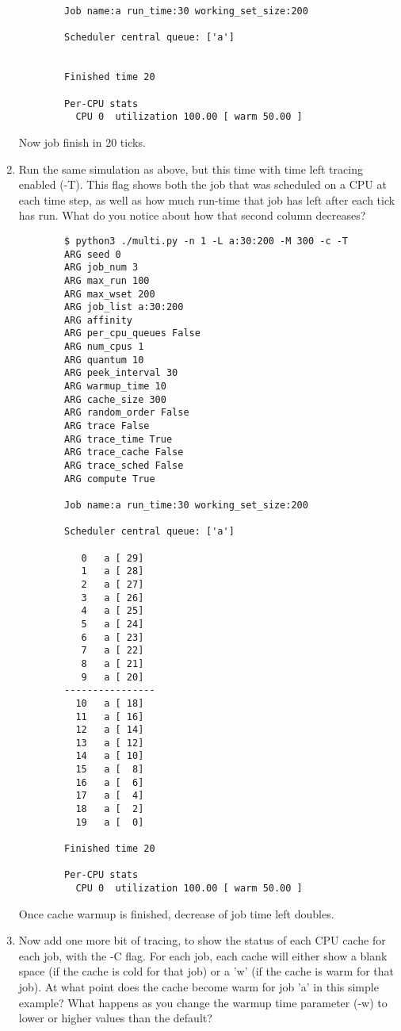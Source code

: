\documentclass{article}
\begin{document}
\begin{enumerate}[label=\textbf{\arabic*}), start=1]
{\begin{verbatim}
        Job name:a run_time:30 working_set_size:200
        
        Scheduler central queue: ['a']
        
        
        Finished time 20
        
        Per-CPU stats
          CPU 0  utilization 100.00 [ warm 50.00 ]
    \end{verbatim}
    }
    Now job finish in 20 ticks.
\newpage
    \item Run the same simulation as above, but this time with time
    left tracing enabled (-T). This flag shows both the job that was
    scheduled on a CPU at each time step, as well as how much run-time
    that job has left after each tick has run. What do you notice
    about how that second column decreases?
    {\scriptsize
    \begin{verbatim}
        $ python3 ./multi.py -n 1 -L a:30:200 -M 300 -c -T
        ARG seed 0
        ARG job_num 3
        ARG max_run 100
        ARG max_wset 200
        ARG job_list a:30:200
        ARG affinity 
        ARG per_cpu_queues False
        ARG num_cpus 1
        ARG quantum 10
        ARG peek_interval 30
        ARG warmup_time 10
        ARG cache_size 300
        ARG random_order False
        ARG trace False
        ARG trace_time True
        ARG trace_cache False
        ARG trace_sched False
        ARG compute True
        
        Job name:a run_time:30 working_set_size:200
        
        Scheduler central queue: ['a']
        
           0   a [ 29]      
           1   a [ 28]      
           2   a [ 27]      
           3   a [ 26]      
           4   a [ 25]      
           5   a [ 24]      
           6   a [ 23]      
           7   a [ 22]      
           8   a [ 21]      
           9   a [ 20]      
        ----------------
          10   a [ 18]      
          11   a [ 16]      
          12   a [ 14]      
          13   a [ 12]      
          14   a [ 10]      
          15   a [  8]      
          16   a [  6]      
          17   a [  4]      
          18   a [  2]      
          19   a [  0]      
        
        Finished time 20
        
        Per-CPU stats
          CPU 0  utilization 100.00 [ warm 50.00 ]
    \end{verbatim}
    }
    Once cache warmup is finished, decrease of job time left doubles.
\newpage
    \item Now add one more bit of tracing, to show the status
    of each CPU cache for each job, with the -C flag. For each
    job, each cache will either show a blank space (if the cache
    is cold for that job) or a ’w’ (if the cache is warm for that
    job). At what point does the cache become warm for job ’a’ in
    this simple example? What happens as you change the warmup time
    parameter (-w) to lower or higher values than the default?


\end{enumerate}
\end{document}
